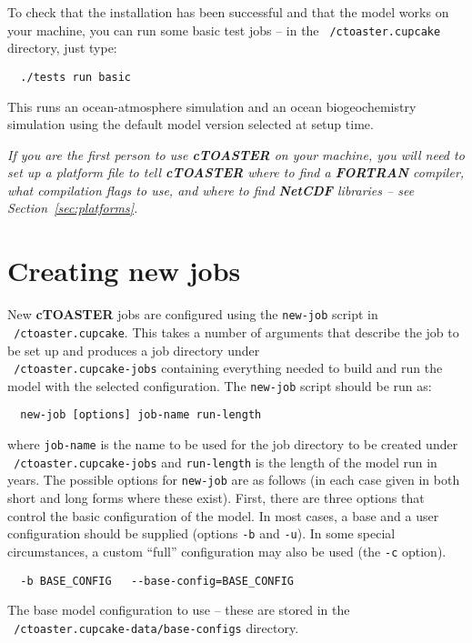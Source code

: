 \documentclass[a4paper,10pt,article]{memoir}
\begin{document}
To check that the installation has been successful and that the model works on your machine, you can run some basic test jobs -- in the \texttt{~/ctoaster.cupcake} directory, just type:
\begin{verbatim}
  ./tests run basic
\end{verbatim}
This runs an ocean-atmosphere simulation and an ocean biogeochemistry simulation using the default model version selected at setup time.

\emph{If you are the first person to use \textbf{cTOASTER} on your machine, you
  will need to set up a platform file to tell \textbf{cTOASTER} where to find a
  \textbf{FORTRAN} compiler, what compilation flags to use, and where to find
  \textbf{NetCDF} libraries -- see Section~\ref{sec:platforms}.}

\section{Creating new jobs}

New \textbf{cTOASTER} jobs are configured using the \texttt{new-job} script in
\texttt{~/ctoaster.cupcake}. This takes a number of arguments that describe the
job to be set up and produces a job directory under
\\\texttt{~/ctoaster.cupcake-jobs} containing everything needed to build and run
the model with the selected configuration.  The \texttt{new-job}
script should be run as:
\begin{verbatim}
  new-job [options] job-name run-length
\end{verbatim}
where \texttt{job-name} is the name to be used for the job directory
to be created under \texttt{~/ctoaster.cupcake-jobs} and \texttt{run-length} is
the length of the model run in years.  The possible options for
\texttt{new-job} are as follows (in each case given in both short and
long forms where these exist).  First, there are three options that
control the basic configuration of the model.  In most cases, a base
and a user configuration should be supplied (options \texttt{-b} and
\texttt{-u}).  In some special circumstances, a custom ``full''
configuration may also be used (the \texttt{-c} option).

\begin{verbatim}
  -b BASE_CONFIG   --base-config=BASE_CONFIG
\end{verbatim}
The base model configuration to use -- these are stored in the
\texttt{~/ctoaster.cupcake-data/base-configs} directory.
\end{document}
